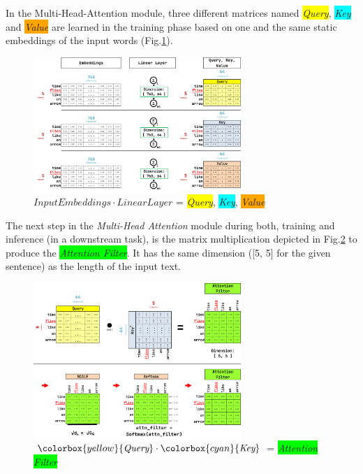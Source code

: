 In the Multi-Head-Attention module, three different matrices named \colorbox{yellow}{\emph{Query}}, \colorbox{cyan}{\emph{Key}} and \colorbox{orange}{\emph{Value}} are learned in the training phase based on one and the same static embeddings of the input words (Fig.\ref{fig:qkv1}).

\begin{figure}[H]
	\centering
	\includegraphics[width=0.7\textwidth]{Assets/qkv1}
	\caption{$Input Embeddings \cdot Linear Layer$ = \colorbox{yellow}{\emph{Query}}, \colorbox{cyan}{\emph{Key}}, \colorbox{orange}{\emph{Value}}}
	\label{fig:qkv1}
\end{figure}

The next step in the \emph{Multi-Head Attention} module during both, training and inference (in a downstream task), is the matrix multiplication depicted in Fig.\ref{fig:attnfilter} to produce the \colorbox{lime}{\emph{Attention Filter}}.
It has the same dimension ([5, 5] for the given sentence) as the length of the input text.
\begin{figure}[H]
	\centering
	\includegraphics[width=0.7\textwidth]{Assets/attnfilter}
	\caption{$\colorbox{yellow}{\emph{Query}} \cdot \colorbox{cyan}{\emph{Key}}$ = \colorbox{lime}{\emph{Attention Filter}}}
	\label{fig:attnfilter}
\end{figure}

